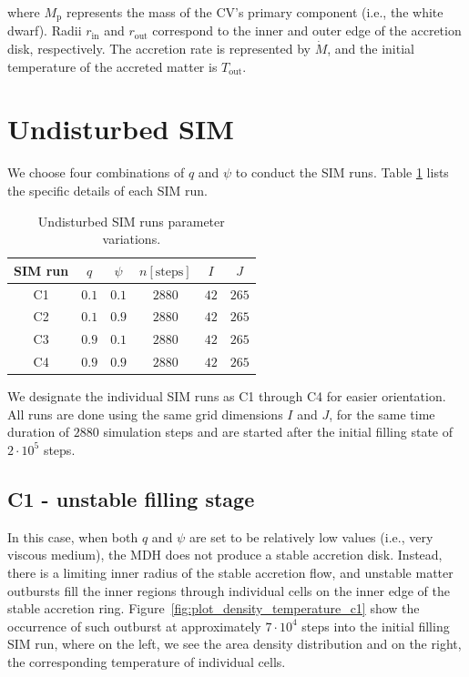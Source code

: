     where $M_{\mathrm{p}}$ represents the mass of the CV's primary component (i.e., the white dwarf). Radii $r_{\mathrm{in}}$ and $r_{\mathrm{out}}$ correspond to the inner and outer edge of the accretion disk, respectively. The accretion rate is represented by $\dot{M}$, and the initial temperature of the accreted matter is $T_{\mathrm{out}}$.

\section{Undisturbed SIM}
    We choose four combinations of $q$ and $\psi$ to conduct the SIM runs. Table \ref{tab:table_simultation_cases_undisturbed} lists the specific details of each SIM run.

    \begin{table}[ht]
    \centering
    \begin{tabular*}{\columnwidth}{@{\extracolsep{\fill}}cccccc}
    SIM run & $q$ & $\psi$ & $n [\mathrm{steps}]$ & $I$ & $J$ \\ 
    \hline\hline
        C1 & $0.1$ & $0.1$ & $2880$ & $42$ & $265$ \\
        C2 & $0.1$ & $0.9$ & $2880$ & $42$ & $265$ \\
        C3 & $0.9$ & $0.1$ & $2880$ & $42$ & $265$ \\
        C4 & $0.9$ & $0.9$ & $2880$ & $42$ & $265$ \\
    \hline
    \end{tabular*}
    \caption{Undisturbed SIM runs parameter variations.}
    \label{tab:table_simultation_cases_undisturbed}
    \end{table}

    We designate the individual SIM runs as C1 through C4 for easier orientation. All runs are done using the same grid dimensions $I$ and $J$, for the same time duration of $2880$ simulation steps and are started after the initial filling state of $2 \cdot 10^5$ steps. 

\subsection{C1 - unstable filling stage}
    In this case, when both $q$ and $\psi$ are set to be relatively low values (i.e., very viscous medium), the MDH does not produce a stable accretion disk. Instead, there is a limiting inner radius of the stable accretion flow, and unstable matter outbursts fill the inner regions through individual cells on the inner edge of the stable accretion ring. 
    Figure~\ref{fig:plot_density_temperature_c1} show the occurrence of such outburst at approximately $7 \cdot 10^4$ steps into the initial filling SIM run, where on the left, we see the area density distribution and on the right, the corresponding temperature of individual cells.

